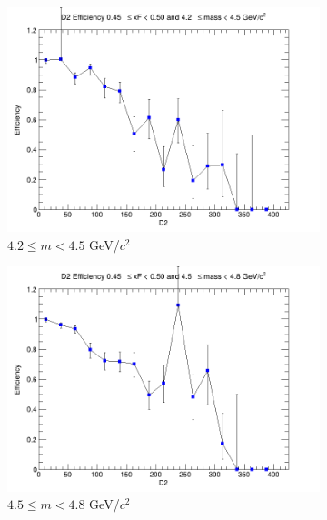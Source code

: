 \documentclass[11pt]{article}
\begin{document}
\begin{figure}[p]
    \centering
    \begin{subfigure}[b]{0.32\textwidth}
        \centering
        \includegraphics[width=\textwidth]{./kTrackerEfficiencyPlots/D2_Efficiency_xF9_mass0.png}
        \caption{$4.2 \leq m < 4.5$ GeV/$c^2$}
    \end{subfigure}\hfill
    \begin{subfigure}[b]{0.32\textwidth}
        \centering
        \includegraphics[width=\textwidth]{./kTrackerEfficiencyPlots/D2_Efficiency_xF9_mass1.png}
        \caption{$4.5 \leq m < 4.8$ GeV/$c^2$}
    \end{subfigure}\hfill
    \begin{subfigure}[b]{0.32\textwidth}
        \centering

\end{subfigure}
\end{figure}
\end{document}
